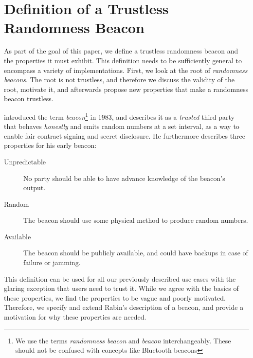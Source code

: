\section{Definition of a Trustless Randomness Beacon}\label{sec:beacons}

As part of the goal of this paper, we define a trustless randomness beacon and the properties it must exhibit.
This definition needs to be sufficiently general to encompass a variety of implementations.
First, we look at the root of \emph{randomness beacons}.
The root is not trustless, and therefore we discuss the validity of the root, motivate it, and afterwards propose new properties that make a randomness beacon trustless.

\citet{rabin1983transaction} introduced the term \emph{beacon}\footnote{We use the terms \emph{randomness beacon} and \emph{beacon} interchangeably.
These should not be confused with concepts like Bluetooth beacons} in 1983, and describes it as a \emph{trusted} third party that behaves \emph{honestly} and emits random numbers at a set interval, as a way to enable fair contract signing and secret disclosure.
He furthermore describes three properties for his early beacon:

\begin{description}
    \item[Unpredictable] No party should be able to have advance knowledge of the beacon's output.
    \item[Random] The beacon should use some physical method to produce random numbers.
    \item[Available] The beacon should be publicly available, and could have backups in case of failure or jamming.
\end{description}

This definition can be used for all our previously described use cases with the glaring exception that users need to trust it.
While we agree with the basics of these properties, we find the properties to be vague and poorly motivated.
Therefore, we specify and extend Rabin's description of a beacon, and provide a motivation for why these properties are needed.
